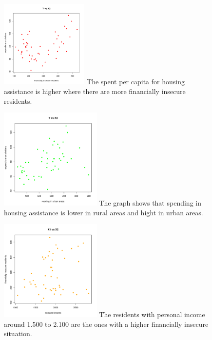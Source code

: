 \documentclass[12pt,letterpaper]{article}
\begin{document}
	
	
	
	
		\begin{figure}[ht]
		\centering
		\includegraphics[width=0.39\textwidth]{plot_example2.pdf}
		\center
			The spent per capita for housing assistance is higher where there are more financially insecure residents.
	\end{figure}
	
	
	
	\begin{figure}[ht]
	\centering
	\includegraphics[width=0.45\textwidth]{plot_example3.pdf}
	\center
			The graph shows that spending in housing assistance is lower in rural areas and hight in urban areas.
	\end{figure}
	
	
	
	\begin{figure}[ht]
	\centering
	\includegraphics[width=0.45\textwidth]{plot_example4.pdf}
	\center
			The residents with personal income around 1.500 to 2.100 are the ones with a higher financially insecure situation.
	\end{figure}
	
\end{document}
